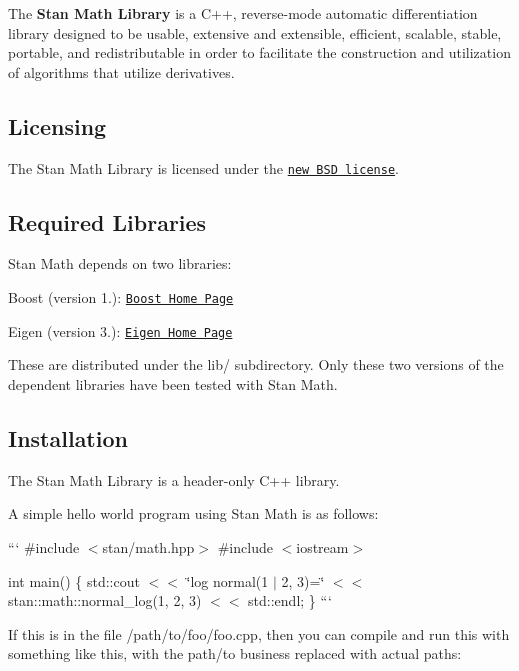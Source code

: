 The {\bfseries Stan Math Library} is a C++, reverse-\/mode automatic differentiation library designed to be usable, extensive and extensible, efficient, scalable, stable, portable, and redistributable in order to facilitate the construction and utilization of algorithms that utilize derivatives.

\subsection*{Licensing }

The Stan Math Library is licensed under the \href{https://raw.githubusercontent.com/stan-dev/math/develop/licenses/stan-math-library-license.txt}{\tt new B\+S\+D license}.

\subsection*{Required Libraries }

Stan Math depends on two libraries\+:


\begin{DoxyItemize}
\item Boost (version 1.)\+: \href{http://www.boost.org}{\tt Boost Home Page}
\item Eigen (version 3.)\+: \href{http://eigen.tuxfamily.org/index.php?title=Main_Page}{\tt Eigen Home Page}
\end{DoxyItemize}

These are distributed under the {\ttfamily lib/} subdirectory. Only these two versions of the dependent libraries have been tested with Stan Math.

\subsection*{Installation }

The Stan Math Library is a header-\/only C++ library.

A simple hello world program using Stan Math is as follows\+:

``` \#include $<$stan/math.\+hpp$>$ \#include $<$iostream$>$

int main() \{ std\+::cout $<$$<$ \char`\"{}log normal(1 $\vert$ 2, 3)=\char`\"{} $<$$<$ stan\+::math\+::normal\+\_\+log(1, 2, 3) $<$$<$ std\+::endl; \} ```

If this is in the file {\ttfamily /path/to/foo/foo.cpp}, then you can compile and run this with something like this, with the {\ttfamily path/to} business replaced with actual paths\+:

